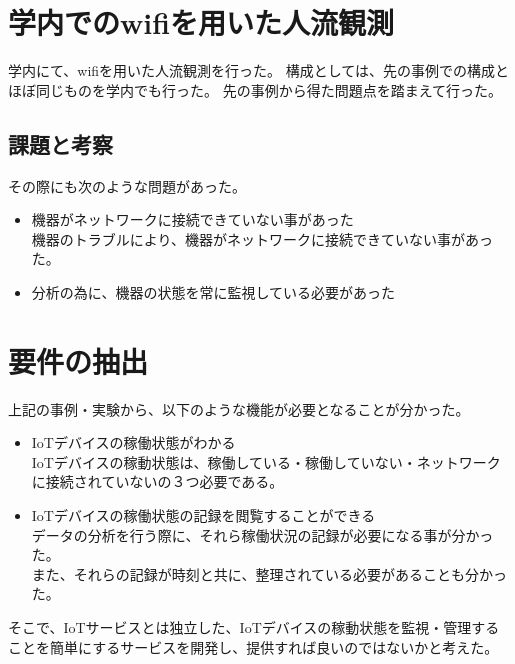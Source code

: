 \section{学内でのwifiを用いた人流観測}
学内にて、wifiを用いた人流観測を行った。
構成としては、先の事例での構成とほぼ同じものを学内でも行った。
先の事例から得た問題点を踏まえて行った。

\subsection{課題と考察}
その際にも次のような問題があった。
\begin{itemize}
	\item 機器がネットワークに接続できていない事があった\\
		機器のトラブルにより、機器がネットワークに接続できていない事があった。
	\item 分析の為に、機器の状態を常に監視している必要があった\\
\end{itemize}

\section{要件の抽出}
上記の事例・実験から、以下のような機能が必要となることが分かった。

\begin{itemize}
\item IoTデバイスの稼働状態がわかる\\
	IoTデバイスの稼動状態は、稼働している・稼働していない・ネットワークに接続されていないの３つ必要である。
\item IoTデバイスの稼働状態の記録を閲覧することができる\\
	データの分析を行う際に、それら稼働状況の記録が必要になる事が分かった。\\
	また、それらの記録が時刻と共に、整理されている必要があることも分かった。
\end{itemize}

そこで、IoTサービスとは独立した、IoTデバイスの稼動状態を監視・管理することを簡単にするサービスを開発し、提供すれば良いのではないかと考えた。




